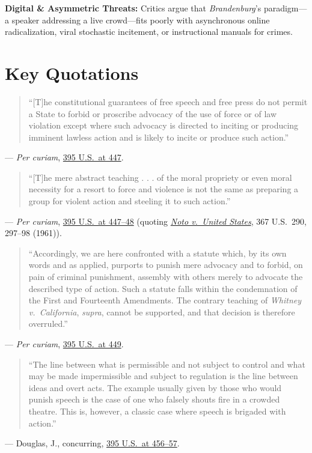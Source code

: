 \documentclass[12pt]{article}
\begin{document}
\textbf{Digital \& Asymmetric Threats:} Critics argue that \emph{Brandenburg}'s paradigm---a speaker addressing a live crowd---fits poorly with asynchronous online radicalization, viral stochastic incitement, or instructional manuals for crimes.

\section{Key Quotations}
\begin{quote}
``[T]he constitutional guarantees of free speech and free press do not permit a State to forbid or proscribe advocacy of the use of force or of law violation except where such advocacy is directed to inciting or producing imminent lawless action and is likely to incite or produce such action.''
\end{quote}
\noindent --- \emph{Per curiam}, \href{https://supreme.justia.com/cases/federal/us/395/444/}{395 U.S.\ at 447}.

\begin{quote}
``[T]he mere abstract teaching . . . of the moral propriety or even moral necessity for a resort to force and violence is not the same as preparing a group for violent action and steeling it to such action.''
\end{quote}
\noindent --- \emph{Per curiam}, \href{https://supreme.justia.com/cases/federal/us/395/444/}{395 U.S.\ at 447--48} (quoting \href{https://supreme.justia.com/cases/federal/us/367/290/}{\emph{Noto v.\ United States}}, 367 U.S.\ 290, 297--98 (1961)).

\begin{quote}
``Accordingly, we are here confronted with a statute which, by its own words and as applied, purports to punish mere advocacy and to forbid, on pain of criminal punishment, assembly with others merely to advocate the described type of action. Such a statute falls within the condemnation of the First and Fourteenth Amendments. The contrary teaching of \emph{Whitney v.\ California}, \emph{supra}, cannot be supported, and that decision is therefore overruled.''
\end{quote}
\noindent --- \emph{Per curiam}, \href{https://supreme.justia.com/cases/federal/us/395/444/}{395 U.S.\ at 449}.

\begin{quote}
``The line between what is permissible and not subject to control and what may be made impermissible and subject to regulation is the line between ideas and overt acts. The example usually given by those who would punish speech is the case of one who falsely shouts fire in a crowded theatre. This is, however, a classic case where speech is brigaded with action.''
\end{quote}
\noindent --- Douglas, J., concurring, \href{https://supreme.justia.com/cases/federal/us/395/444/}{395 U.S.\ at 456--57}.
\end{document}
